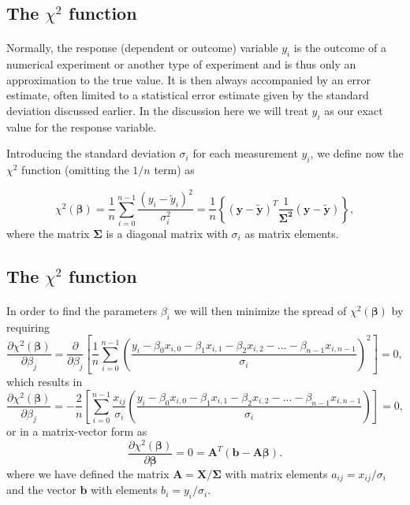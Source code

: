 \documentclass[%
oneside,                 %
final,                   %
10pt]{article}
\begin{document}
\subsection*{The $\chi^2$ function}

\paragraph{}

Normally, the response (dependent or outcome) variable $y_i$ is the
outcome of a numerical experiment or another type of experiment and is
thus only an approximation to the true value. It is then always
accompanied by an error estimate, often limited to a statistical error
estimate given by the standard deviation discussed earlier. In the
discussion here we will treat $y_i$ as our exact value for the
response variable.

Introducing the standard deviation $\sigma_i$ for each measurement
$y_i$, we define now the $\chi^2$ function (omitting the $1/n$ term)
as

\[
\chi^2(\bm{\beta})=\frac{1}{n}\sum_{i=0}^{n-1}\frac{\left(y_i-\tilde{y}_i\right)^2}{\sigma_i^2}=\frac{1}{n}\left\{\left(\bm{y}-\bm{\tilde{y}}\right)^T\frac{1}{\bm{\Sigma^2}}\left(\bm{y}-\bm{\tilde{y}}\right)\right\},
\]
where the matrix $\bm{\Sigma}$ is a diagonal matrix with $\sigma_i$ as matrix elements.



\subsection*{The $\chi^2$ function}

\paragraph{}

In order to find the parameters $\beta_i$ we will then minimize the spread of $\chi^2(\bm{\beta})$ by requiring
\[
\frac{\partial \chi^2(\bm{\beta})}{\partial \beta_j} = \frac{\partial }{\partial \beta_j}\left[ \frac{1}{n}\sum_{i=0}^{n-1}\left(\frac{y_i-\beta_0x_{i,0}-\beta_1x_{i,1}-\beta_2x_{i,2}-\dots-\beta_{n-1}x_{i,n-1}}{\sigma_i}\right)^2\right]=0, 
\]
which results in
\[
\frac{\partial \chi^2(\bm{\beta})}{\partial \beta_j} = -\frac{2}{n}\left[ \sum_{i=0}^{n-1}\frac{x_{ij}}{\sigma_i}\left(\frac{y_i-\beta_0x_{i,0}-\beta_1x_{i,1}-\beta_2x_{i,2}-\dots-\beta_{n-1}x_{i,n-1}}{\sigma_i}\right)\right]=0, 
\]
or in a matrix-vector form as
\[
\frac{\partial \chi^2(\bm{\beta})}{\partial \bm{\beta}} = 0 = \bm{A}^T\left( \bm{b}-\bm{A}\bm{\beta}\right).  
\]
where we have defined the matrix $\bm{A} =\bm{X}/\bm{\Sigma}$ with matrix elements $a_{ij} = x_{ij}/\sigma_i$ and the vector $\bm{b}$ with elements $b_i = y_i/\sigma_i$.
\end{document}

